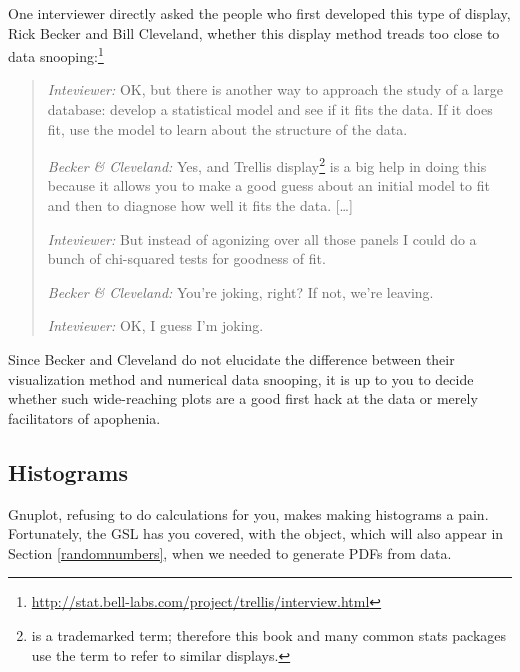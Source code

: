 One interviewer directly asked the people who first developed
this type of display, Rick Becker and Bill Cleveland,
whether this display method treads too close to data
snooping:\footnote{\url{http://stat.bell-labs.com/project/trellis/interview.html}}

\begin{quote}
{\em Inteviewer:} OK, but there is another way to approach the study of a large database:
develop a statistical model and see if it fits the data. If it does fit,
use the model to learn about the structure of the data.

{\em Becker \& Cleveland:} Yes, and Trellis
display\footnote{ is a trademarked term; therefore
this book and many common stats packages use the term 
to refer to similar displays.} is a big help in doing this because it
allows you to make a good guess about an initial model to fit and then
to diagnose how well it fits the data. [\dots]

{\em Inteviewer:} But instead of agonizing over all those panels I could do a bunch of
chi-squared tests for goodness of fit.

{\em Becker \& Cleveland:} You're joking, right? If not, we're leaving.

{\em Inteviewer:} OK, I guess I'm joking.
\end{quote}

Since Becker and Cleveland do not elucidate the difference between their
visualization method and numerical data snooping, it is up to you to
decide whether such wide-reaching plots are a good first hack at the
data or merely facilitators of apophenia.

\subsection{Histograms} 
Gnuplot, refusing to do calculations for you,
makes making histograms a pain.  Fortunately, the GSL has you covered,
with the  object, which will also appear
in Section \ref{randomnumbers}, when we needed to generate PDFs from data.

